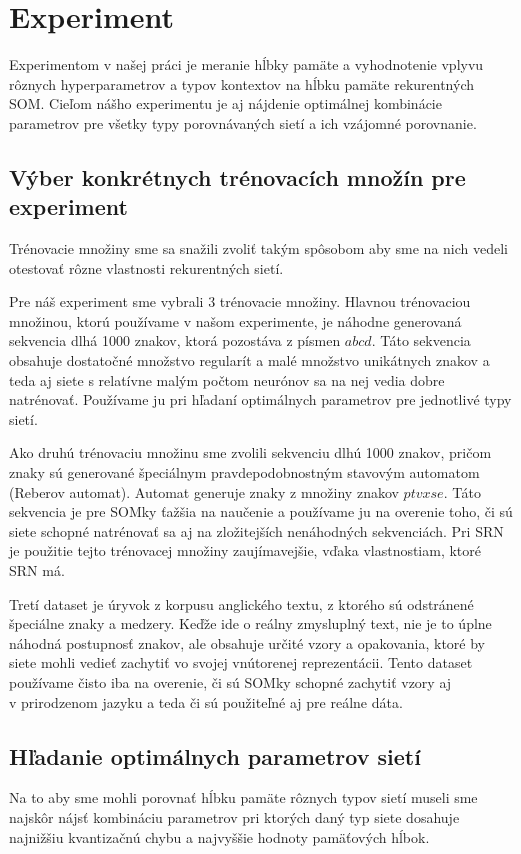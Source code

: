 \chapter{Experiment}
Experimentom v našej práci je meranie hĺbky pamäte a vyhodnotenie vplyvu rôznych
hyperparametrov a typov kontextov na hĺbku pamäte rekurentných SOM.
Cieľom nášho experimentu je aj nájdenie 
optimálnej kombinácie parametrov pre všetky typy porovnávaných sietí a ich vzájomné porovnanie.

\section{Výber konkrétnych trénovacích množín pre experiment}
Trénovacie množiny sme sa snažili zvoliť
takým spôsobom aby sme na nich vedeli otestovať rôzne vlastnosti rekurentných sietí.

Pre náš experiment sme vybrali 3 trénovacie množiny.
Hlavnou trénovaciou množinou, ktorú používame v našom experimente, je náhodne generovaná 
sekvencia dlhá 1000 znakov, ktorá pozostáva z písmen $abcd$.
Táto sekvencia obsahuje dostatočné množstvo regularít a malé množstvo unikátnych znakov a teda
aj siete s relatívne malým počtom neurónov sa na nej vedia dobre natrénovať.
Používame ju pri hľadaní optimálnych parametrov pre jednotlivé typy sietí.

Ako druhú trénovaciu množinu sme zvolili sekvenciu dlhú 1000 znakov, pričom znaky sú generované
špeciálnym pravdepodobnostným stavovým automatom (Reberov automat). Automat generuje znaky z množiny znakov $ptvxse$.
Táto sekvencia je pre SOMky ťažšia na naučenie a používame ju na overenie toho, či sú siete schopné natrénovať sa aj
na zložitejších nenáhodných sekvenciách. Pri SRN je použitie tejto trénovacej množiny zaujímavejšie,
vďaka vlastnostiam, ktoré SRN má.

Tretí dataset je úryvok z korpusu anglického textu, z ktorého sú odstránené špeciálne znaky a medzery.
Keďže ide o reálny zmysluplný text, nie je to úplne náhodná postupnosť znakov, ale obsahuje určité vzory a opakovania, ktoré by siete mohli vedieť zachytiť
vo svojej vnútorenej reprezentácii.
Tento dataset používame čisto iba na overenie, či 
sú SOMky schopné zachytiť vzory aj \\ v prirodzenom jazyku a teda či sú použiteľné aj pre 
reálne dáta.

\section{Hľadanie optimálnych parametrov sietí}
Na to aby sme mohli porovnať hĺbku pamäte rôznych typov sietí museli sme najskôr
nájsť kombináciu parametrov pri ktorých daný typ siete dosahuje najnižšiu kvantizačnú chybu a 
najvyššie hodnoty pamäťových hĺbok. 

